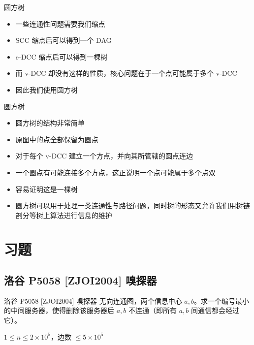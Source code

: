 ﻿\documentclass[aspectratio=169]{ctexbeamer}
\begin{document}
\begin{frame}{圆方树}
    \begin{itemize}
        \item 一些连通性问题需要我们缩点
        \item SCC 缩点后可以得到一个 DAG
        \item e-DCC 缩点后可以得到一棵树
        \item 而 v-DCC 却没有这样的性质，核心问题在于一个点可能属于多个 v-DCC
        \item 因此我们使用圆方树
    \end{itemize}
\end{frame}

\begin{frame}{圆方树}
    \begin{itemize}
        \item 圆方树的结构非常简单
        \item 原图中的点全部保留为圆点
        \item 对于每个 v-DCC 建立一个方点，并向其所管辖的圆点连边
        \item 一个圆点有可能连接多个方点，这正说明一个点可能属于多个点双
        \item 容易证明这是一棵树
        \item 圆方树可以用于处理一类连通性与路径问题，同时树的形态又允许我们用树链剖分等树上算法进行信息的维护
    \end{itemize}
\end{frame}









\section{习题}

\subsection{洛谷 P5058 [ZJOI2004] 嗅探器}

\begin{frame}{洛谷 P5058 [ZJOI2004] 嗅探器}
      无向连通图，两个信息中心 $a,b$。求一个编号最小的中间服务器，使得删除该服务器后 $a,b$ 不连通（即所有 $a,b$ 间通信都会经过它）。
      
      $1\le n\le 2\times 10^5$，边数 $\le 5\times 10^5$
\end{frame}
\end{document}
